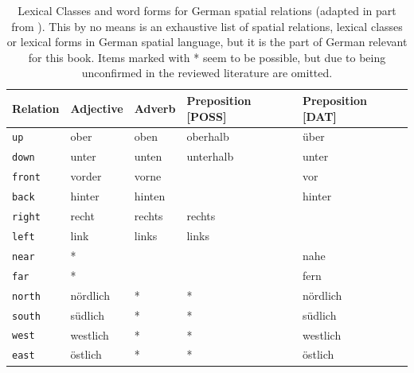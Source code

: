 \begin{center}
\begin{table}
\begin{centering}
\label{t:lexical-class-word-forms}
\caption[Lexical Classes and word forms for German spatial relations]
{Lexical Classes and word forms for German spatial relations 
(adapted in part from \citealp{tenbrink2007space}). This by no means
is an exhaustive list of spatial relations, lexical classes or lexical forms 
in German spatial language, but it is the part of German relevant for 
this book. Items marked with * seem to be possible, but due to being
unconfirmed in the reviewed literature are omitted.\newline}
\begin{tabular}{|  p{1.4cm} ||  p{2.0cm} | p{2.0cm}  | p{2.0cm} | p{2.0cm}  | }
\hline
Relation & Adjective & Adverb & Preposition [POSS] & Preposition [DAT] \\\hline\hline
{\footnotesize\tt up} & ober & oben & oberhalb & {\"u}ber \\\hline
{\footnotesize\tt down} & unter & unten & unterhalb & unter\\\hline
{\footnotesize\tt front} & vorder & vorne & & vor \\\hline
{\footnotesize\tt back}  & hinter & hinten  & & hinter\\\hline
{\footnotesize\tt right} & recht & rechts  & rechts & \\\hline
{\footnotesize\tt left} & link & links & links & \\\hline
{\footnotesize\tt near} & * & &  & nahe \\\hline
{\footnotesize\tt far} & * &  & & fern \\\hline
{\footnotesize\tt north}  & n\"ordlich & * & * & n\"ordlich \\\hline
{\footnotesize\tt south} & s\"udlich & * & * & s\"udlich \\\hline
{\footnotesize\tt west} & westlich & * & * & westlich \\\hline
{\footnotesize\tt east} & \"ostlich & * & * & \"ostlich \\\hline
\end{tabular}
\end{centering}
\end{table}
\end{center}

